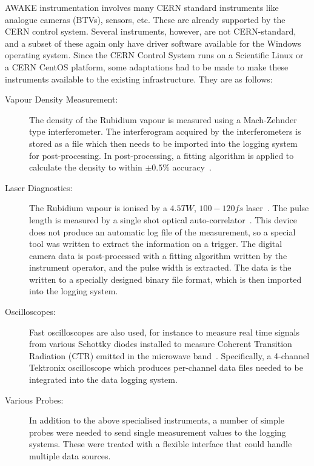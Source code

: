 AWAKE instrumentation involves many CERN standard instruments like analogue cameras (BTVs), sensors, etc.
These are already supported by the CERN control system.
Several instruments, however, are not CERN-standard, and a subset of these again only have driver software available for the Windows operating system.
Since the CERN Control System runs on a Scientific Linux or a CERN CentOS platform, some adaptations had to be made to make these instruments available to the existing infrastructure.
They are as follows:
\begin{description}
    \item[Vapour Density Measurement:]
    The density of the Rubidium vapour is measured using a Mach-Zehnder type interferometer.
    The interferogram acquired by the interferometers is stored as a file which then needs to be imported into the logging system for post-processing.
    In post-processing, a fitting algorithm is applied to calculate the density to within $\pm0.5\%$ accuracy~\cite{oz:2016, batsch:2018}.

    \item[Laser Diagnostics:]
    The Rubidium vapour is ionised by a $4.5\unit{TW}$, $100-120\unit{fs}$ laser~\cite{gschwendtner:2016}.
    The pulse length is measured by a single shot optical auto-correlator~\cite{salin:1987}.
    This device does not produce an automatic log file of the measurement, so a special tool was written to extract the information on a trigger.
    The digital camera data is post-processed with a fitting algorithm written by the instrument operator, and the pulse width is extracted.
    The data is the written to a specially designed binary file format, which is then imported into the logging system.

    \item[Oscilloscopes:]
    Fast oscilloscopes are also used, for instance to measure real time signals from various Schottky diodes installed to measure Coherent Transition Radiation (CTR) emitted in the microwave band~\cite{braunmueller:2018}.
    Specifically, a 4-channel Tektronix oscilloscope which produces per-channel data files needed to be integrated into the data logging system.

    \item[Various Probes:]
    In addition to the above specialised instruments, a number of simple probes were needed to send single measurement values to the logging systems.
    These were treated with a flexible interface that could handle multiple data sources.
\end{description}


